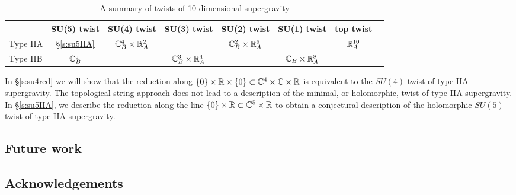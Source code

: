 \begin{table}[]
\begin{tabular}{c|c|c|c|c|c|c|c|}
\cline{2-7}
& SU(5) twist & SU(4) twist & SU(3) twist & SU(2) twist & SU(1) twist & top twist  \\ \hline
\multicolumn{1}{|l|}{Type IIA} & \S \ref{s:su5IIA} & $\mathbb C^4_B \times \mathbb R^2_A$ & & $\mathbb C^2_B \times \mathbb R^6_A$ &  & $\mathbb R^{10}_A$  \\ \hline
\multicolumn{1}{|l|}{Type IIB} & $\mathbb C^5_B$ & & $\mathbb C^3_B \times \mathbb R^4_A$ & & $\mathbb C_B \times \mathbb R^8_A$ & \\ \hline
\end{tabular}
\caption{A summary of twists of 10-dimensional supergravity}
\label{table:IIsugra}
\end{table}

In \S \ref{s:su4red} we will show that the reduction along $\{0\} \times \mathbb R \times \{0\} \subset \mathbb C^4 \times \mathbb C \times \mathbb R$ is equivalent to the $SU(4)$ twist of type IIA supergravity. 
The topological string approach does not lead to a description of the minimal, or holomorphic, twist of type IIA supergravity. 
In \S \ref{s:su5IIA}, we describe the reduction along the line $\{0\} \times \mathbb R \subset \mathbb C^5 \times \mathbb R$ to obtain a conjectural description of the holomorphic $SU(5)$ twist of type IIA supergravity. 


\subsection*{Future work} 

\subsection*{Acknowledgements}


%
